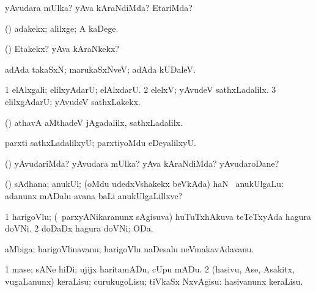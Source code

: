 {{{{{{\bentry
{} 
\gl{\kirxvi}
\expl{}
\bmng
yAvudara mUlka? yAva kAraNdiMda? EtariMda? 
\emng
\eentry

\bentry
{} 
\gl{\saMavayx}
\expl{}
\bmng
(\aupa) adakekx; alilxge; A kaDege. 
\emng
\eentry

\bentry
{} 
\gl{\kirxvi}
\expl{}
\bmng
(\aupa) Etakekx? yAva kAraNkekx? 
\emng
\eentry

\bentry
{} 
\gl{\saMavayx}
\expl{}
\bmng
adAda takaSxN; marukaSxNveV; adAda kUDaleV. 
\emng
\eentry

\bentry
{} 
\gl{\kirxvi}
\expl{}
\bmng
\bnum
\num{1} elAlxgali; elilxyAdarU; elAlxdarU. 
\num{2} elelxV; yAvudeV sathxLadalilx. 
\num{3} elilxgAdarU; yAvudeV sathxLakekx. 
\enum
\emng

\noindent 
\gl{\pagu}
\expl{}
\bmng
{} (\AmA) athavA aMthadeV jAgadalilx, sathxLadalilx. 
\emng
\eentry

\bentry
{}
\gl{\saMavayx}
\expl{}
\bmng
parxti sathxLadalilxyU; parxtiyoMdu eDeyalilxyU. 
\emng
\eentry

\bentry
{} 
\gl{\kirxvi}
\expl{}
\bmng
(\pArxparx) yAvudariMda? yAvudara mUlka? yAva kAraNdiMda? yAvudaroDane? 
\emng
\eentry

\bentry
{} 
\gl{\nA}
\expl{}
\bmng
(\AmA) sAdhana; anukUl; (oMdu udedxVshakekx beVkAda) haN \mo\ anukUlgaLu:  adanunx mADalu avana baLi anukUlgaLillxve? 
\emng
\eentry

\bentry
{} 
\gl{\nA}
\bmng
\bnum
\num{1} harigoVlu; (\sA\ parxyANikaranunx sAgisuva) huTuTxhAkuva teTeTxyAda hagura doVNi. 
\num{2} doDaDx hagura doVNi; ODa. 
\enum
\emng
\eentry

\bentry
{} 
\gl{\nA}
\bmng
aMbiga; harigoVlinavanu; harigoVlu naDesalu neVmakavAdavanu. 
\emng
\eentry

\bentry
{} 
\gl{\sakirx}
\bmng
\bnum
\num{1} mase; sANe hiDi; ujijx haritamADu, cUpu mADu. 
\num{2} (hasivu, Ase, Asakitx, \mo vugaLanunx) keraLisu; curukugoLisu; tiVkaSx NxvAgisu:  hasivanunx keraLisu. 
\enum
\emng
\eentry

}}}}}}
